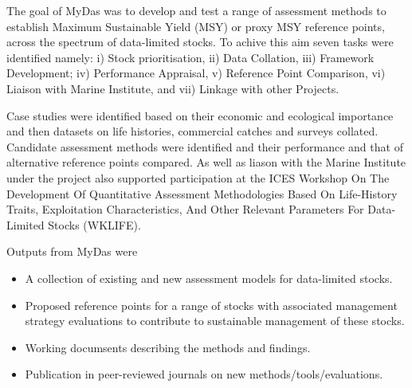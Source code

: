 The goal of MyDas was to develop and test a range of assessment methods to establish Maximum Sustainable Yield (MSY) or proxy MSY reference points, across the spectrum of data-limited stocks. To achive this aim seven tasks were identified namely: i) Stock prioritisation, ii) Data Collation, iii) Framework Development; iv) Performance Appraisal, v) Reference Point Comparison, vi) Liaison with Marine Institute, and vii) Linkage with other Projects. 

Case studies were identified based on their economic and ecological importance and then datasets on life histories, commercial catches and surveys collated. Candidate assessment methods were identified and their performance and that of alternative reference points compared. As well as liason with the Marine Institute under the project also supported participation at the ICES Workshop On The Development Of Quantitative Assessment Methodologies Based On Life-History Traits, Exploitation Characteristics, And Other Relevant Parameters For Data-Limited Stocks (WKLIFE).

Outputs from MyDas were 
\begin{itemize}[noitemsep,topsep=0pt,parsep=0pt,partopsep=0pt]
 \item A collection of existing and new assessment models for data-limited stocks. 
 \item Proposed reference points for a range of stocks with associated management strategy evaluations to contribute to sustainable management of these stocks.
 \item Working documsents describing the methods and findings.
 \item Publication in peer-reviewed journals on new methods/tools/evaluations.
\end{itemize}

